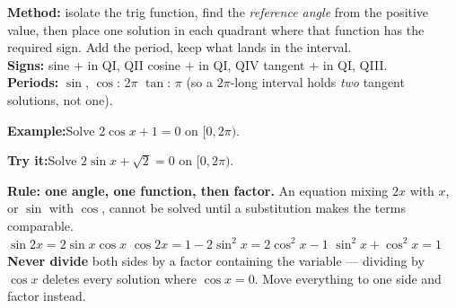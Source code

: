 \documentclass[12pt]{article}
\begin{document}


\begin{formulabox}
\textbf{Method:} isolate the trig function, find the \emph{reference angle} from
the positive value, then place one solution in each quadrant where that function
has the required sign. Add the period, keep what lands in the interval.\\[2pt]
\textbf{Signs:} sine $+$ in QI, QII \quad cosine $+$ in QI, QIV \quad tangent $+$
in QI, QIII.\\
\textbf{Periods:} $\sin$, $\cos$: $2\pi$ \quad $\tan$: $\pi$ (so a $2\pi$-long
interval holds \emph{two} tangent solutions, not one).
\end{formulabox}

\begin{examplebox}
\textbf{Example:}\quad Solve $2\cos x + 1 = 0$ on $[0, 2\pi)$.
\end{examplebox}

\begin{tryitbox}
\textbf{Try it:}\quad Solve $2\sin x + \sqrt{2} = 0$ on $[0, 2\pi)$.\\[2pt]
\end{tryitbox}


\begin{formulabox}
\textbf{Rule: one angle, one function, then factor.} An equation mixing $2x$ with
$x$, or $\sin$ with $\cos$, cannot be solved until a substitution makes the terms
comparable.\\[2pt]
$\sin 2x = 2\sin x\cos x$ \qquad $\cos 2x = 1 - 2\sin^2 x = 2\cos^2 x - 1$
\qquad $\sin^2 x + \cos^2 x = 1$\\[2pt]
\textbf{Never divide} both sides by a factor containing the variable --- dividing
by $\cos x$ deletes every solution where $\cos x = 0$. Move everything to one
side and factor instead.
\end{formulabox}
\end{document}
